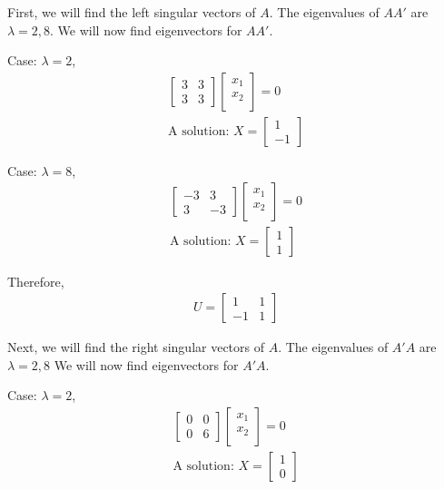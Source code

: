 First, we will find the left singular vectors of \(A\).
The eigenvalues of \(AA'\) are \(\lambda = 2,8\).
We will now find eigenvectors for \(AA'\).

Case: \(\lambda = 2\),
\begin{eqnarray}
  \begin{bmatrix}
    3 & 3 \\
    3 & 3
  \end{bmatrix}
  \begin{bmatrix}
    x_1 \\
    x_2 \\
  \end{bmatrix}
  = 0 \\
  \text{A solution: }
  X = 
  \begin{bmatrix}
    1 \\
    -1
  \end{bmatrix}
\end{eqnarray}

Case: \(\lambda = 8 \),
\begin{eqnarray}
  \begin{bmatrix}
    -3 & 3 \\
    3 & -3
  \end{bmatrix}
  \begin{bmatrix}
    x_1 \\
    x_2 \\
  \end{bmatrix}
  = 0 \\
  \text{A solution: }
  X = 
  \begin{bmatrix}
    1 \\
    1
  \end{bmatrix}
\end{eqnarray}

Therefore,
\begin{eqnarray}
  U = 
  \begin{bmatrix}
    1 & 1 \\
    -1 & 1
  \end{bmatrix}
\end{eqnarray}

Next, we will find the right singular vectors of \(A\).
The eigenvalues of \(A'A\) are \(\lambda = 2,8\)
We will now find eigenvectors for \(A'A\).

Case: \(\lambda = 2\),
\begin{eqnarray}
  \begin{bmatrix}
    0 & 0 \\
    0 & 6
  \end{bmatrix}
  \begin{bmatrix}
    x_1 \\
    x_2 \\
  \end{bmatrix}
  = 0 \\
  \text{A solution: }
  X = 
  \begin{bmatrix}
    1 \\
    0
  \end{bmatrix}
\end{eqnarray}

